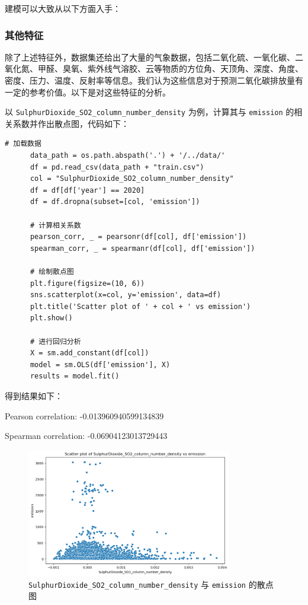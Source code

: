 \documentclass{ctexart}
\begin{document}
建模可以大致从以下方面入手：

\subsubsection{其他特征}

除了上述特征外，数据集还给出了大量的气象数据，包括二氧化硫、一氧化碳、二氧化氮、甲醛、臭氧、紫外线气溶胶、云等物质的方位角、天顶角、深度、角度、密度、压力、温度、反射率等信息。我们认为这些信息对于预测二氧化碳排放量有一定的参考价值。以下是对这些特征的分析。

以 \texttt{SulphurDioxide\_SO2\_column\_number\_density} 为例，计算其与 \texttt{emission} 的相关系数并作出散点图，代码如下：

\begin{lstlisting}[style=Python]
      # 加载数据
      data_path = os.path.abspath('.') + '/../data/'
      df = pd.read_csv(data_path + "train.csv")
      col = "SulphurDioxide_SO2_column_number_density"
      df = df[df['year'] == 2020]
      df = df.dropna(subset=[col, 'emission'])
      
      # 计算相关系数
      pearson_corr, _ = pearsonr(df[col], df['emission'])
      spearman_corr, _ = spearmanr(df[col], df['emission'])
      
      # 绘制散点图
      plt.figure(figsize=(10, 6))
      sns.scatterplot(x=col, y='emission', data=df)
      plt.title('Scatter plot of ' + col + ' vs emission')
      plt.show()
      
      # 进行回归分析
      X = sm.add_constant(df[col])
      model = sm.OLS(df['emission'], X)
      results = model.fit()
\end{lstlisting}

得到结果如下：

\begin{center}
Pearson correlation: -0.013960940599134839

Spearman correlation: -0.06904123013729443
\end{center}


\begin{figure}[H]
      \centering
      \includegraphics[width=0.8\textwidth]{output1.png}
      \caption{\texttt{SulphurDioxide\_SO2\_column\_number\_density} 与 \texttt{emission} 的散点图}
\end{figure}
\end{document}
